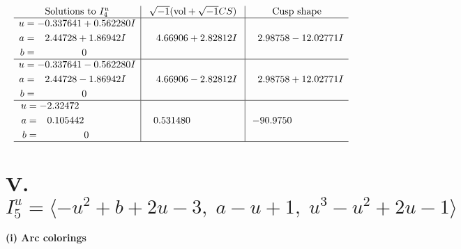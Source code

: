 \documentclass[1p]{elsarticle_modified}
\theoremstyle{definition}
\newcommand{\I}{\sqrt{-1}}
\begin{document}
$$\begin{array}{c|c|c}  
\text{Solutions to }I^u_{4}& \I (\text{vol} + \sqrt{-1}CS) & \text{Cusp shape}\\
 \hline 
\begin{aligned}
u &= -0.337641 + 0.562280 I \\
a &= \phantom{-}2.44728 + 1.86942 I \\
b &= \phantom{-0.000000 } 0\end{aligned}
 & \phantom{-}4.66906 + 2.82812 I & \phantom{-}2.98758 - 12.02771 I \\ \hline\begin{aligned}
u &= -0.337641 - 0.562280 I \\
a &= \phantom{-}2.44728 - 1.86942 I \\
b &= \phantom{-0.000000 } 0\end{aligned}
 & \phantom{-}4.66906 - 2.82812 I & \phantom{-}2.98758 + 12.02771 I \\ \hline\begin{aligned}
u &= -2.32472\phantom{ +0.000000I} \\
a &= \phantom{-}0.105442\phantom{ +0.000000I} \\
b &= \phantom{-0.000000 } 0\end{aligned}
 & \phantom{-}0.531480\phantom{ +0.000000I} & -90.9750\phantom{ +0.000000I}\\
 \hline 
 \end{array}$$\newpage\newpage\renewcommand{\arraystretch}{1}
\centering \section*{V. $I^u_{5}= \langle - u^2+b+2 u-3,\;a- u+1,\;u^3- u^2+2 u-1 \rangle$}
\flushleft \textbf{(i) Arc colorings}\\
\end{document}
